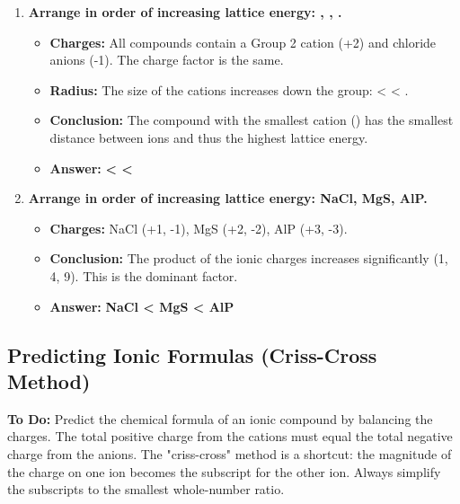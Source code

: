 \documentclass{article}
\begin{document}
\begin{enumerate}[itemsep=5pt]
\begin{itemize}
    \end{itemize}
    \item \textbf{Arrange in order of increasing lattice energy: , , .}
    \begin{itemize}
        \item \textbf{Charges:} All compounds contain a Group 2 cation (+2) and chloride anions (-1). The charge factor is the same.
        \item \textbf{Radius:} The size of the cations increases down the group:  <  < .
        \item \textbf{Conclusion:} The compound with the smallest cation () has the smallest distance between ions and thus the highest lattice energy.
        \item \textbf{Answer:} \textbf{ <  < }
    \end{itemize}
    \item \textbf{Arrange in order of increasing lattice energy: NaCl, MgS, AlP.}
    \begin{itemize}
        \item \textbf{Charges:} NaCl (+1, -1), MgS (+2, -2), AlP (+3, -3).
        \item \textbf{Conclusion:} The product of the ionic charges increases significantly (1, 4, 9). This is the dominant factor.
        \item \textbf{Answer:} \textbf{NaCl < MgS < AlP}
    \end{itemize}
\end{enumerate}

\subsection*{Predicting Ionic Formulas (Criss-Cross Method)}
\textbf{To Do:} Predict the chemical formula of an ionic compound by balancing the charges. The total positive charge from the cations must equal the total negative charge from the anions. The "criss-cross" method is a shortcut: the magnitude of the charge on one ion becomes the subscript for the other ion. Always simplify the subscripts to the smallest whole-number ratio.
\end{document}
